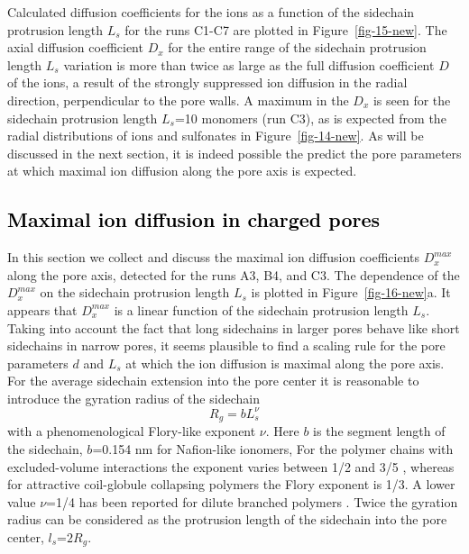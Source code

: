 \documentclass[3p,english,preprint]{elsarticle}
\newcommand{\mod}[1]{\textcolor{black}{#1}}
\begin{document}
Calculated diffusion coefficients for the ions as a 
function of the sidechain  protrusion length 
$L_s$ for the runs C1-C7 are plotted in Figure~\ref{fig-15-new}. 
The axial diffusion coefficient $D_x$ for the entire range 
of the sidechain  protrusion  length $L_s$ variation is more than twice 
as large as the full 
diffusion coefficient $D$ of the ions, a result of the strongly suppressed ion diffusion
in the radial direction, perpendicular to the pore walls. A maximum in the 
$D_x$ is seen for  the sidechain  protrusion  
length $L_s$=10 monomers (run C3), as is expected from 
the radial distributions of ions and sulfonates in  Figure~\ref{fig-14-new}.
As will be  discussed in the next section, it is indeed possible 
the predict the pore parameters at which  maximal ion diffusion 
along the pore axis is expected. 







{\mod{ 
\subsection{Maximal ion diffusion in charged pores}
}}
\label{maximal-diffusion}
In this section we collect and discuss the maximal ion diffusion coefficients $D_x^{max}$ 
along the pore axis, detected for the runs A3, B4, and C3.  The dependence of the $D_x^{max}$  on the sidechain
protrusion length $L_s$ is plotted in Figure~\ref{fig-16-new}a.
It appears that  $D_x^{max}$ is a linear function of the sidechain protrusion 
length $L_s$.
Taking into account the fact that long sidechains in larger pores behave like 
short sidechains in narrow pores, it seems plausible 
to find a scaling rule for the pore parameters $d$ and $L_s$ at which the ion diffusion is maximal along
the pore axis. For the average sidechain extension into the pore center 
it is reasonable to introduce the  gyration radius of the sidechain 
\begin{equation}
R_g=b L_s^{\nu}
\end{equation}  
with a phenomenological Flory-like exponent $\nu$.
Here $b$ is the segment length of the sidechain, $b$=0.154 nm for 
Nafion-like ionomers,
For the polymer chains  with excluded-volume interactions the exponent varies 
between 1/2 and 3/5   \cite{flory-exponent}, whereas for attractive coil-globule collapsing
polymers the Flory exponent is 1/3. A lower value  $\nu$=1/4    
 has been reported for dilute branched polymers 
\cite{lubensky-1980-flory-exponent,joanny-1980-flory-exponent}. 
Twice the  gyration radius can be considered as the protrusion length of the 
sidechain into the pore center, $l_s$=$2 R_g$.  
 
\end{document}
